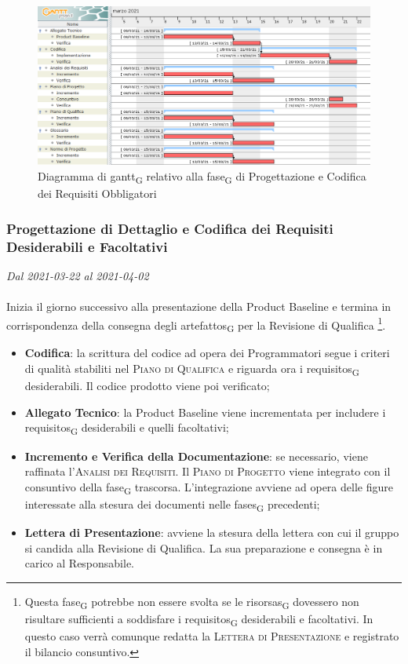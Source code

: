 \begin{figure}[H]
	\centering
	\includegraphics[scale=0.52]{res/images/04_gantt_codifica_obbligatori.png}
	\caption{Diagramma di \gls{gantt}\textsubscript{G} relativo alla \gls{fase}\textsubscript{G} di Progettazione  e Codifica dei Requisiti Obbligatori}
\end{figure}



\subsubsection{Progettazione di Dettaglio e Codifica dei Requisiti Desiderabili e Facoltativi}

\textit{Dal 2021-03-22 al 2021-04-02}
\\\\
Inizia il giorno successivo alla presentazione della Product Baseline e termina in corrispondenza della consegna degli \glspl{artefatto}\textsubscript{G} per la Revisione di Qualifica \footnote{Questa \gls{fase}\textsubscript{G} potrebbe non essere svolta se le \glspl{risorsa}\textsubscript{G} dovessero non risultare sufficienti a soddisfare i \glspl{requisito}\textsubscript{G} desiderabili e facoltativi. In questo caso verrà comunque redatta la \textsc{Lettera di Presentazione} e registrato il bilancio consuntivo.}.
\begin{itemize}
	\item \textbf{Codifica}: la scrittura del codice ad opera dei Programmatori segue i criteri di qualità stabiliti nel \textsc{Piano di Qualifica} e riguarda ora i \glspl{requisito}\textsubscript{G} desiderabili. Il codice prodotto viene poi verificato;
	\item \textbf{Allegato Tecnico}: la Product Baseline viene incrementata per includere i \glspl{requisito}\textsubscript{G} desiderabili e quelli facoltativi;
	\item \textbf{Incremento e Verifica della Documentazione}: se necessario, viene raffinata l'\textsc{Analisi dei Requisiti}. Il \textsc{Piano di Progetto} viene integrato con il consuntivo della \gls{fase}\textsubscript{G} trascorsa. L'integrazione avviene ad opera delle figure interessate alla stesura dei documenti nelle \glspl{fase}\textsubscript{G} precedenti;
	\item \textbf{Lettera di Presentazione}: avviene la stesura della lettera con cui il gruppo si candida alla Revisione di Qualifica. La sua preparazione e consegna è in carico al Responsabile.
	
\end{itemize}


